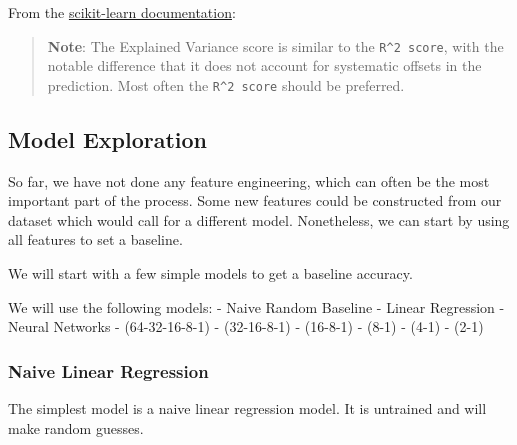 \documentclass[11pt]{article}
\begin{document}
From the
\href{https://scikit-learn.org/stable/modules/generated/sklearn.metrics.explained_variance_score.html}{scikit-learn
documentation}:

\begin{quote}
\textbf{Note}: The Explained Variance score is similar to the
\texttt{R\^{}2\ score}, with the notable difference that it does not
account for systematic offsets in the prediction. Most often the
\texttt{R\^{}2\ score} should be preferred.
\end{quote}

    \subsection{Model Exploration}\label{model-exploration}

So far, we have not done any feature engineering, which can often be the
most important part of the process. Some new features could be
constructed from our dataset which would call for a different model.
Nonetheless, we can start by using all features to set a baseline.

We will start with a few simple models to get a baseline accuracy.

We will use the following models: - Naive Random Baseline - Linear
Regression - Neural Networks - (64-32-16-8-1) - (32-16-8-1) - (16-8-1) -
(8-1) - (4-1) - (2-1)

\subsubsection{Naive Linear Regression}\label{naive-linear-regression}

The simplest model is a naive linear regression model. It is untrained
and will make random guesses.
\end{document}
